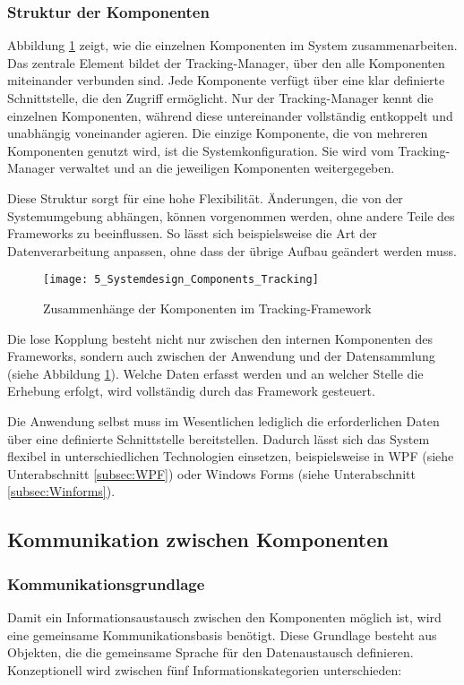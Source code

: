 \subsubsection{Struktur der Komponenten}
Abbildung \ref{fig:system_design_components} zeigt, wie die einzelnen Komponenten im System zusammenarbeiten. Das zentrale Element bildet der {Tracking-Manager}, über den alle Komponenten miteinander verbunden sind. Jede Komponente verfügt über eine klar definierte Schnittstelle, die den Zugriff ermöglicht. Nur der Tracking-Manager kennt die einzelnen Komponenten, während diese untereinander vollständig entkoppelt und unabhängig voneinander agieren. Die einzige Komponente, die von mehreren Komponenten genutzt wird, ist die Systemkonfiguration. Sie wird vom Tracking-Manager verwaltet und an die jeweiligen Komponenten weitergegeben.

Diese Struktur sorgt für eine hohe Flexibilität. Änderungen, die von der Systemumgebung abhängen, können vorgenommen werden, ohne andere Teile des Frameworks zu beeinflussen. So lässt sich beispielsweise die Art der Datenverarbeitung anpassen, ohne dass der übrige Aufbau geändert werden muss.

\begin{figure}[H]
    \centering
    \texttt{[image: 5\_Systemdesign\_Components\_Tracking]}
    \caption{Zusammenhänge der Komponenten im Tracking-Framework}
    \label{fig:system_design_components}
\end{figure}

Die lose Kopplung besteht nicht nur zwischen den internen Komponenten des Frameworks, sondern auch zwischen der Anwendung und der Datensammlung (siehe Abbildung \ref{fig:system_design_components}). Welche Daten erfasst werden und an welcher Stelle die Erhebung erfolgt, wird vollständig durch das Framework gesteuert.

Die Anwendung selbst muss im Wesentlichen lediglich die erforderlichen Daten über eine definierte Schnittstelle bereitstellen. Dadurch lässt sich das System flexibel in unterschiedlichen Technologien einsetzen, beispielsweise in WPF (siehe Unterabschnitt \ref{subsec:WPF}) oder Windows Forms (siehe Unterabschnitt \ref{subsec:Winforms}).

\subsection{Kommunikation zwischen Komponenten}

\subsubsection{Kommunikationsgrundlage}
Damit ein Informationsaustausch zwischen den Komponenten möglich ist, wird eine gemeinsame Kommunikationsbasis benötigt. Diese Grundlage besteht aus Objekten, die die gemeinsame Sprache für den Datenaustausch definieren.  
Konzeptionell wird zwischen fünf Informationskategorien unterschieden:

